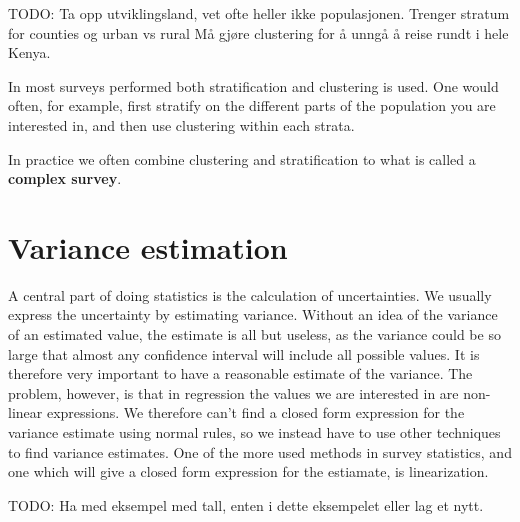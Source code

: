 \documentclass{article}
\begin{document}
TODO: Ta opp utviklingsland, vet ofte heller ikke populasjonen.
Trenger stratum for counties og urban vs rural
Må gjøre clustering for å unngå å reise rundt i hele Kenya.

In most surveys performed both stratification and clustering is used. One would
often, for example, first stratify on the different parts of the population you
are interested in, and then use clustering within each strata.

In practice we often combine clustering and stratification to what is called a
\textbf{complex survey}. 

\section{Variance estimation}

A central part of doing statistics is the calculation of uncertainties. We
usually express the uncertainty by estimating variance. Without an idea of the
variance of an estimated value, the estimate is all but useless, as the variance
could be so large that almost any confidence interval will include all possible
values. It is therefore very important to have a reasonable estimate of the
variance. The problem, however, is that in regression the values we are
interested in are non-linear expressions. We therefore can't find a closed form
expression for the variance estimate using normal rules, so we instead have to
use other techniques to
find variance estimates. One of the more used methods in survey
statistics, and one which will give a closed form expression for the estiamate,
is linearization.

TODO: Ha med eksempel med tall, enten i dette eksempelet eller lag et nytt.
\end{document}
